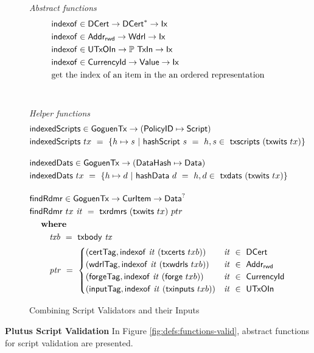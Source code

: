 \begin{figure}[htb]
  \emph{Abstract functions}
  \begin{align*}
    &\fun{indexof} \in \DCert \to \seqof{\DCert} \to \Ix\\
    &\fun{indexof} \in \AddrRWD \to \Wdrl \to \Ix\\
    &\fun{indexof} \in \UTxOIn \to \powerset{\TxIn} \to \Ix\\
    &\fun{indexof} \in \CurrencyId \to \Value \to \Ix\\
    & \text{get the index of an item in the an ordered representation} \\
    \nextdef
  \end{align*}
  \emph{Helper functions}
  \begin{align*}
    &\fun{indexedScripts} \in \GoguenTx \to (\PolicyID \mapsto \Script) \\
    &\fun{indexedScripts}~{tx} ~=~ \{ h \mapsto s ~\vert~ \fun{hashScript}~{s}~=~h,
     s\in~\fun{txscripts}~(\fun{txwits}~{tx})\}
    \nextdef
    &\fun{indexedDats} \in \GoguenTx \to (\DataHash \mapsto \Data)\\
    &\fun{indexedDats}~{tx} ~=~ \{ h \mapsto d ~\vert~ \fun{hashData}~{d}~=~h,
     d\in~\fun{txdats}~(\fun{txwits}~{tx})\}
    &\nextdef
    &\fun{findRdmr} \in \GoguenTx \to \CurItem \to \Data^?\\
    & \fun{findRdmr}~{tx}~\var{it} ~=~ \fun{txrdmrs}~(\fun{txwits}~{tx})~ptr \\
      & ~~\where \\
      & ~~~~~~~ \var{txb}~=~\txbody{tx} \\
      & ~~~~~~~ \var{ptr}~=~
      \begin{cases}
        (\mathsf{certTag},\fun{indexof}~\var{it}~(\fun{txcerts}~{txb}))   & \var{it}~\in~\DCert \\
        (\mathsf{wdrlTag},\fun{indexof}~\var{it}~(\fun{txwdrls}~{txb}))   & \var{it}~\in~\AddrRWD \\
        (\mathsf{forgeTag},\fun{indexof}~\var{it}~(\fun{forge}~{txb}))    & \var{it}~\in~\CurrencyId \\
        (\mathsf{inputTag},\fun{indexof}~\var{it}~(\fun{txinputs}~{txb})) & \var{it}~\in~\UTxOIn
      \end{cases}
  \end{align*}
  \caption{Combining Script Validators and their Inputs}
  \label{fig:functions:script1}
\end{figure}

\textbf{Plutus Script Validation}
In Figure \ref{fig:defs:functions-valid}, abstract functions for script validation
are presented.

